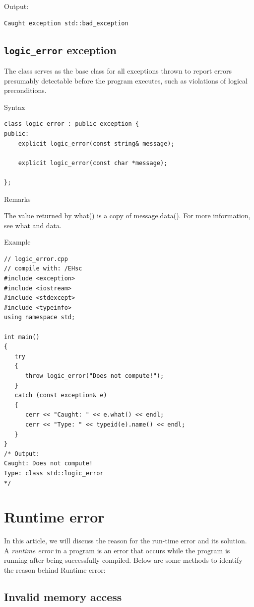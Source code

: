 \documentclass{book}
\begin{document}
Output:

\begin{verbatim}
Caught exception std::bad_exception
\end{verbatim}

\subsection{\texttt{logic\_error} exception}

The class serves as the base class for all exceptions thrown to report errors presumably detectable before the program executes, such as violations of logical preconditions.

Syntax

\begin{verbatim}
class logic_error : public exception {
public:
    explicit logic_error(const string& message);

    explicit logic_error(const char *message);

};
\end{verbatim}

Remarks

The value returned by what() is a copy of message.data(). For more information, see what and data.

Example 

\begin{lstlisting}
// logic_error.cpp
// compile with: /EHsc
#include <exception>
#include <iostream>
#include <stdexcept>
#include <typeinfo>
using namespace std;

int main()
{
   try
   {
      throw logic_error("Does not compute!");
   }
   catch (const exception& e)
   {
      cerr << "Caught: " << e.what() << endl;
      cerr << "Type: " << typeid(e).name() << endl;
   }
}
/* Output:
Caught: Does not compute!
Type: class std::logic_error
*/
\end{lstlisting}

\section{Runtime error}

In this article, we will discuss the reason for the run-time error and its solution. A \textit{runtime error} in a program is an error that occurs while the program is running after being successfully compiled. Below are some methods to identify the reason behind Runtime error:

\subsection{Invalid memory access}
\end{document}
